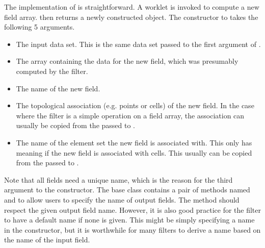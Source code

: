 The implementation of  is straightforward.
A worklet is invoked to compute a new field array.
 then returns a newly constructed  object.
The constructor to  takes the following 5 arguments.
\begin{itemize}
\item
  The input data set.
  This is the same data set passed to the first argument of .
\item
  The array containing the data for the new field, which was presumably computed by the filter.
\item
  The name of the new field.
\item
  The topological association (e.g. points or cells) of the new field.
  In the case where the filter is a simple operation on a field array, the association can usually be copied from the  passed to .
\item
  The name of the element set the new field is associated with.
  This only has meaning if the new field is associated with cells.
  This usually can be copied from the  passed to .
\end{itemize}

Note that all fields need a unique name, which is the reason for the third argument to the  constructor.
The  base class contains a pair of methods named  and  to allow users to specify the name of output fields.
The  method should respect the given output field name.
However, it is also good practice for the filter to have a default name if none is given.
This might be simply specifying a name in the constructor, but it is worthwhile for many filters to derive a name based on the name of the input field.





